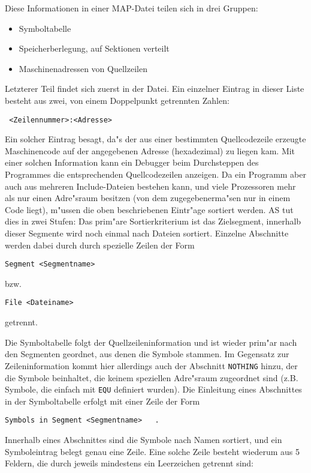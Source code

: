 \documentclass[12pt,a4paper,twoside]{report}
\newcommand{\tty}[1]{{\tt #1}}
\begin{document}
{Diese Informationen in einer MAP-Datei teilen sich in drei Gruppen:
\begin{itemize}
\item{Symboltabelle}
\item{Speicherberlegung, auf Sektionen verteilt}
\item{Maschinenadressen von Quellzeilen}
\end{itemize}
Letzterer Teil findet sich zuerst in der Datei.  Ein einzelner
Eintrag in dieser Liste besteht aus zwei, von einem Doppelpunkt
getrennten Zahlen:
\begin{verbatim}
 <Zeilennummer>:<Adresse>
\end{verbatim}
Ein solcher Eintrag besagt, da"s der aus einer bestimmten
Quellcodezeile erzeugte Maschinencode auf der angegebenen Adresse
(hexadezimal) zu liegen kam.  Mit einer solchen Information kann ein
Debugger beim Durchsteppen des Programmes die entsprechenden
Quellcodezeilen anzeigen.  Da ein Programm aber auch aus mehreren
Include-Dateien bestehen kann, und viele Prozessoren mehr als nur
einen Adre"sraum besitzen (von dem zugegebenerma"sen nur in einem Code
liegt), m"ussen die oben beschriebenen Eintr"age sortiert werden.  AS
tut dies in zwei Stufen: Das prim"are Sortierkriterium ist das
Zielsegment, innerhalb dieser Segmente wird noch einmal nach Dateien
sortiert.  Einzelne Abschnitte werden dabei durch durch spezielle
Zeilen der Form
\begin{verbatim}
Segment <Segmentname>
\end{verbatim}
bzw. 
\begin{verbatim}
File <Dateiname>
\end{verbatim}
getrennt.

Die Symboltabelle folgt der Quellzeileninformation und ist wieder
prim"ar nach den Segmenten geordnet, aus denen die Symbole stammen. 
Im Gegensatz zur Zeileninformation kommt hier allerdings auch der
Abschnitt \tty{NOTHING} hinzu, der die Symbole beinhaltet, die keinem
speziellen Adre"sraum zugeordnet sind (z.B. Symbole, die einfach mit
\tty{EQU} definiert wurden).  Die Einleitung eines Abschnittes in der
Symboltabelle erfolgt mit einer Zeile der Form
\begin{verbatim}
Symbols in Segment <Segmentname>   .
\end{verbatim}
Innerhalb eines Abschnittes sind die Symbole nach Namen sortiert, und
ein Symboleintrag belegt genau eine Zeile.  Eine solche Zeile besteht
wiederum aus 5 Feldern, die durch jeweils mindestens ein Leerzeichen
getrennt sind:

}
\end{document}
